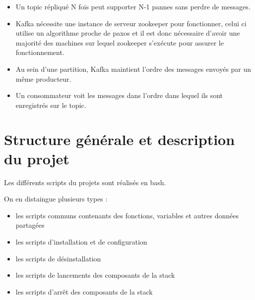 \documentclass[a4paper, 11pt, titlepage]{article}
\begin{document}
\begin{itemize}

\item
Un topic répliqué N fois peut supporter N-1 pannes sans perdre de messages.

\item
Kafka nécessite une instance de serveur zookeeper pour fonctionner, celui ci utilise un algorithme proche de paxos et il est donc nécessaire d'avoir une majorité des machines sur lequel zookeeper s'exécute pour assurer le fonctionnement.

\item
Au sein d'une partition, Kafka maintient l'ordre des messages envoyés par un même producteur.

\item
Un consommateur voit les messages dans l'ordre dans lequel ils sont enregistrés sur le topic.

\end{itemize}







\section {Structure générale et description du projet}

Les différents scripts du projets sont réalisés en bash.

\noindent On en distaingue plusieurs types :

\begin{itemize}

\item
les scripts communs contenants des fonctions, variables et autres données partagées

\item
les scripts d'installation et de configuration

\item
les scripts de désinstallation

\item
les scripts de lancements des composants de la stack

\item
les scripts d'arrêt des composants de la stack

\end{itemize}
\end{document}

